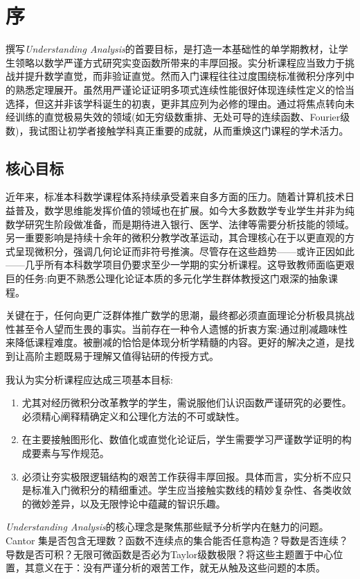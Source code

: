 \chapter{序}

撰写\textit{Understanding Analysis}的首要目标，是打造一本基础性的单学期教材，让学生领略以数学严谨方式研究实变函数所带来的丰厚回报。实分析课程应当致力于挑战并提升数学直觉，而非验证直觉。然而入门课程往往过度围绕标准微积分序列中的熟悉定理展开。虽然用严谨论证证明多项式连续性能很好体现连续性定义的恰当选择，但这并非该学科诞生的初衷，更非其应列为必修的理由。通过将焦点转向未经训练的直觉极易失效的领域(如无穷级数重排、无处可导的连续函数、Fourier级数)，我试图让初学者接触学科真正重要的成就，从而重焕这门课程的学术活力。

\section*{核心目标}

近年来，标准本科数学课程体系持续承受着来自多方面的压力。随着计算机技术日益普及，数学思维能发挥价值的领域也在扩展。如今大多数数学专业学生并非为纯数学研究生阶段做准备，而是期待进入银行、医学、法律等需要分析技能的领域。另一重要影响是持续十余年的微积分教学改革运动，其合理核心在于以更直观的方式呈现微积分，强调几何论证而非符号推演。尽管存在这些趋势——或许正因如此——几乎所有本科数学项目仍要求至少一学期的实分析课程。这导致教师面临更艰巨的任务:向更不熟悉公理化论证本质的多元化学生群体教授这门艰深的抽象课程。

关键在于，任何向更广泛群体推广数学的思潮，最终都必须直面理论分析极具挑战性甚至令人望而生畏的事实。当前存在一种令人遗憾的折衷方案:通过削减趣味性来降低课程难度。被删减的恰恰是体现分析学精髓的内容。更好的解决之道，是找到让高阶主题既易于理解又值得钻研的传授方式。

我认为实分析课程应达成三项基本目标:
\begin{enumerate}
\item 尤其对经历微积分改革教学的学生，需说服他们认识函数严谨研究的必要性。必须精心阐释精确定义和公理化方法的不可或缺性。
\item 在主要接触图形化、数值化或直觉化论证后，学生需要学习严谨数学证明的构成要素与写作规范。
\item 必须让夯实极限逻辑结构的艰苦工作获得丰厚回报。具体而言，实分析不应只是标准入门微积分的精细重述。学生应当接触实数线的精妙复杂性、各类收敛的微妙差异，以及无限悖论中蕴藏的智识乐趣。
\end{enumerate}


\textit{Understanding Analysis}的核心理念是聚焦那些赋予分析学内在魅力的问题。Cantor 集是否包含无理数？函数不连续点的集合能否任意构造？导数是否连续？导数是否可积？无限可微函数是否必为Taylor级数极限？将这些主题置于中心位置，其意义在于：没有严谨分析的艰苦工作，就无从触及这些问题的本质。


